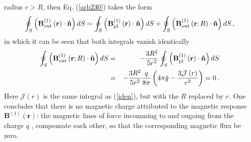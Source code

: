 \documentclass[12pt]{article}
\begin{document}
radius $r>R$, then Eq. (\ref{arb230}) takes the form%
\begin{equation*}
\oint_{S}\left( \mathbf{B}_{\mathrm{out}}^{\left( 1\right) }\left( \mathbf{r}%
\right) \cdot \mathbf{\hat{n}}\right) dS=\oint_{S}\left( \mathbf{B}_{\mathrm{%
pl}}^{\left( 1\right) }\left( \mathbf{r}\right) \cdot \mathbf{\hat{n}}%
\right) dS+\oint_{S}\left( \mathbf{B}_{\mathrm{out}}^{\left( 1\right)
}\left( \mathbf{r};R\right) \cdot \mathbf{\hat{n}}\right) dS\,,
\end{equation*}%
in which it can be seen that both integrals vanish identically%
\begin{eqnarray}
\oint_{S}\left( \mathbf{B}_{\mathrm{out}}^{\left( 1\right) }\left( \mathbf{r}%
;R\right) \cdot \mathbf{\hat{n}}\right) dS &=&-\frac{3R^{2}}{5r^{2}}%
\oint_{S}\left( \mathbf{B}_{\mathrm{pl}}^{\left( 1\right) }\left( \mathbf{r}%
\right) \cdot \mathbf{\hat{n}}\right) dS  \notag \\
&=&-\frac{3R^{2}}{5r^{2}}\frac{q}{8\pi }\left( 4\pi \tilde{g}-\frac{3%
\mathcal{J}\left( r\right) }{r^{2}}\right) =0\,.  \label{arb232}
\end{eqnarray}%
Here $\mathcal{J}\left( r\right) $ is the same integral as (\ref{iden}), but
with the $R$ replaced by $r$. One concludes that there is no magnetic charge
attributed to the magnetic response $\mathbf{B}^{\left( 1\right) }\left( 
\mathbf{r}\right) $: the magnetic lines of force incomming to and ougoing
from the charge $q$ , compensate each other, so that the corresponding
magnetic flux be zero.
\end{document}
